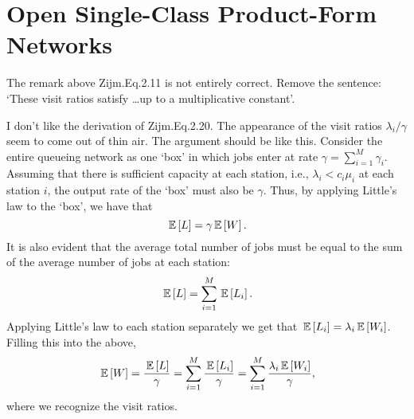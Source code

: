 \section{Open Single-Class Product-Form Networks}
\label{sec:jackson-networks}


The remark above Zijm.Eq.2.11 is not entirely correct. Remove the
sentence: `These visit ratios satisfy \ldots up to a multiplicative
constant'.


I don't like the derivation of Zijm.Eq.2.20. The appearance of the
visit ratios $\lambda_i/\gamma$ seem to come out of thin air. The
argument should be like this. Consider the entire queueing network as
one `box' in which jobs enter at rate $\gamma=\sum_{i=1}^M
\gamma_i$.
Assuming that there is sufficient capacity at each station, i.e.,
$\lambda_i < c_i \mu_i$ at each station $i$, the output rate of the `box' must also be $\gamma$. Thus, by applying Little's law to the `box', we have that 
\begin{equation*}
  \,\mathbb{E}\left[L\right] = \gamma \,\mathbb{E}\left[W\right]. 
\end{equation*}
It is also evident that the average total number of jobs must be equal
to the sum of the average number of  jobs at each station: 
\begin{equation*}
  \,\mathbb{E}\left[L\right] = \sum_{i=1}^M \,\mathbb{E}\left[L_i\right].
\end{equation*}
Applying Little's law to each station separately we get that
$\,\mathbb{E}\left[L_i\right] = \lambda_i\,\mathbb{E}\left[W_i\right]$. Filling this into the above,
\begin{equation*}
\,\mathbb{E}\left[W\right] = \frac{\,\mathbb{E}\left[L\right]}{\gamma}  = \sum_{i=1}^M \frac{\,\mathbb{E}\left[L_i\right]}\gamma = \sum_{i=1}^M \frac{\lambda_i \,\mathbb{E}\left[ W_i\right]}\gamma, 
\end{equation*}
where we recognize the visit ratios.




